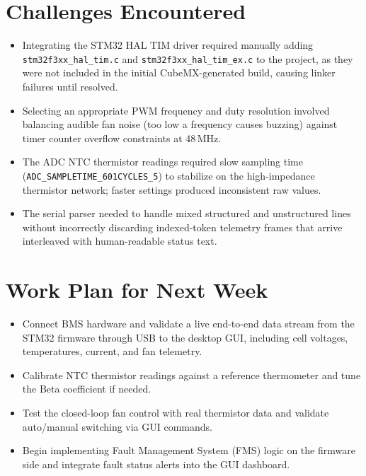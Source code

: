 \documentclass[12pt]{article}
\begin{document}
\vspace{1em}

\section{Challenges Encountered}
\begin{itemize}[leftmargin=1cm]
    \item Integrating the STM32 HAL TIM driver required manually adding \texttt{stm32f3xx\_hal\_tim.c} and \texttt{stm32f3xx\_hal\_tim\_ex.c} to the project, as they were not included in the initial CubeMX-generated build, causing linker failures until resolved.
    \item Selecting an appropriate PWM frequency and duty resolution involved balancing audible fan noise (too low a frequency causes buzzing) against timer counter overflow constraints at 48\,MHz.
    \item The ADC NTC thermistor readings required slow sampling time (\texttt{ADC\_SAMPLETIME\_601CYCLES\_5}) to stabilize on the high-impedance thermistor network; faster settings produced inconsistent raw values.
    \item The serial parser needed to handle mixed structured and unstructured lines without incorrectly discarding indexed-token telemetry frames that arrive interleaved with human-readable status text.
\end{itemize}

\vspace{1em}

\section{Work Plan for Next Week}
\begin{itemize}[leftmargin=1cm]
    \item Connect BMS hardware and validate a live end-to-end data stream from the STM32 firmware through USB to the desktop GUI, including cell voltages, temperatures, current, and fan telemetry.
    \item Calibrate NTC thermistor readings against a reference thermometer and tune the Beta coefficient if needed.
    \item Test the closed-loop fan control with real thermistor data and validate auto/manual switching via GUI commands.
    \item Begin implementing Fault Management System (FMS) logic on the firmware side and integrate fault status alerts into the GUI dashboard.
\end{itemize}
\end{document}
